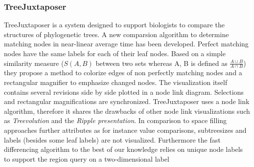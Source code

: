 



\subsubsection{TreeJuxtaposer\cite{munzner2003treejuxtaposer}}
TreeJuxtaposer is a system designed to support biologists to compare the structures of phylogenetic trees. A new comparsion algorithm to determine matching nodes in near-linear average time has been developed. Perfect matching nodes have the same labels for each of their leaf nodes. Based on a simple similarity measure ($S(A,B)$ between two sets whereas A, B is defined as $\frac{A \cup B}{A \cap B}$) they propose a method to colorize edges of non perfectly matching nodes and a rectangular magnifier to emphasize changed nodes. The visualization itself contains several revisions side by side plotted in a node link diagram. Selections and rectangular magnifications are synchronized. TreeJuxtaposer uses a node link algorithm, therefore it shares the drawbacks of other node link visualizations such as \emph{Treevolution} and the \emph{Ripple presentation}. In comparison to space filling approaches further attributes as for instance value comparisons, subtreesizes and labels (besides some leaf labels) are not visualized. Furthermore the fast differencing algorithm to the best of our knowledge relies on unique node labels to support the region query on a two-dimensional label


